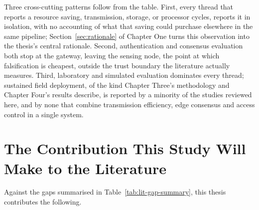 \documentclass[12pt,a4paper,oneside]{book}
\begin{document}
Three cross-cutting patterns follow from the table. First, every thread
that reports a resource saving, transmission, storage, or processor
cycles, reports it in isolation, with no accounting of what that saving
could purchase elsewhere in the same pipeline; Section~\ref{sec:rationale}
of Chapter One turns this observation into the thesis's central rationale.
Second, authentication and consensus evaluation both stop at the gateway,
leaving the sensing node, the point at which falsification is cheapest,
outside the trust boundary the literature actually measures. Third,
laboratory and simulated evaluation dominates every thread; sustained
field deployment, of the kind Chapter Three's methodology and Chapter
Four's results describe, is reported by a minority of the studies
reviewed here, and by none that combine transmission efficiency, edge
consensus and access control in a single system.

\section{The Contribution This Study Will Make to the Literature}
\label{sec:lit_contribution}

Against the gaps summarised in Table~\ref{tab:lit-gap-summary}, this thesis
contributes the following.
\end{document}
